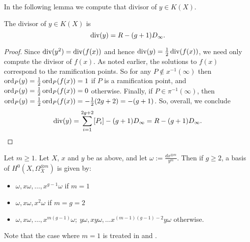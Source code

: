 In the following lemma we compute that divisor of $y \in K(X)$.
    \begin{lem}\label{lemmadivisorofycharacteristicnot2}
    The divisor of $y \in K(X)$ is 
        \begin{equation}\label{equationdivisorofypnot2}
        \operatorname{div}(y)  = R - (g+1)D_\infty.
        \end{equation}
    \end{lem}
    \begin{proof}
    Since $\operatorname{div} (y^2) = \operatorname{div} (f(x))$ and hence $\operatorname{div}(y) = \frac{1}{2}\operatorname{div}(f(x))$, we need only compute the divisor of $f(x)$.
    As noted earlier, the solutions to $f(x)$ correspond to the ramification points.
    So for any $P\notin x^{-1}(\infty)$ then $\operatorname{ord}_P(y) =  \frac{1}{2}\operatorname{ord}_P(f(x)) = 1$ if $P$ is a ramification point, and $\operatorname{ord}_P(y) = \frac{1}{2}\operatorname{ord}_P(f(x)) = 0$ otherwise.
    Finally, if $P\in \pi^{-1}(\infty)$, then $\operatorname{ord}_P(y)  = \frac{1}{2}\operatorname{ord}_P(f(x)) = - \frac{1}{2} (2g+2) = -(g+1)$.
    So, overall, we conclude
        \[
        \operatorname{div}(y) = \sum_{i=1}^{2g+2} [P_i]- (g+1)D_\infty = R - (g+1)D_{\infty}.
        \]
    \end{proof}


    \begin{prop}\label{prophyperellipticbasispnot2}
    Let $m\geq 1$.
    Let $X$, $x$ and $y$ be as above, and let $\omega := \frac{dx^{\otimes m}}{y^m}$. 
    Then if $g\geq 2$, a basis of $H^0(X,\Omega_X^{\otimes m})$ is given by:
        \begin{itemize}
        \item $\omega, x\omega, \ldots , x^{g-1}\omega$ if $m=1$ 
        \item $\omega, x\omega, x^2\omega$  if $m=g=2$ 
        \item $\omega, x\omega, \ldots, x^{m(g-1)}\omega;\  y\omega, xy\omega, \ldots x^{(m-1)(g-1)-2}y\omega$ otherwise.
        \end{itemize}
    \end{prop}
    
    \begin{rem}
    Note that the case where $m=1$ is treated in \cite[Prop. 7.4.26]{liu} and \cite[Ch. IV, \S 4, Prop. 4.3]{griffiths}.
    \end{rem}
    
